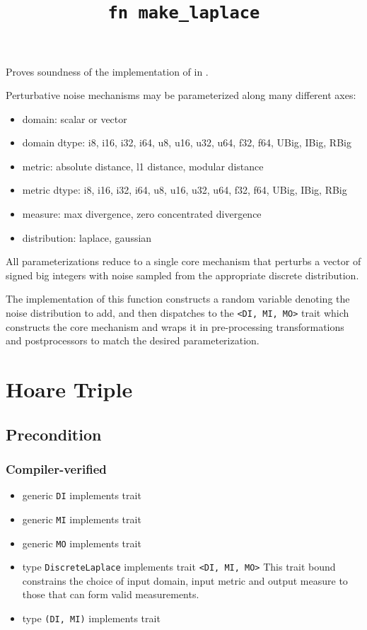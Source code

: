 \documentclass{article}
\title{\texttt{fn make\_laplace}}
\author{\MichaelShoemateAuthor}
\date{}
\begin{document}
\maketitle

\contrib
Proves soundness of the implementation of  in .

Perturbative noise mechanisms may be parameterized along many different axes:
\begin{itemize}
    \item domain: scalar or vector
    \item domain dtype: i8, i16, i32, i64, u8, u16, u32, u64, f32, f64, UBig, IBig, RBig
    \item metric: absolute distance, l1 distance, modular distance
    \item metric dtype: i8, i16, i32, i64, u8, u16, u32, u64, f32, f64, UBig, IBig, RBig
    \item measure: max divergence, zero concentrated divergence
    \item distribution: laplace, gaussian
\end{itemize}

All parameterizations reduce to a single core mechanism that perturbs
a vector of signed big integers with noise sampled from the appropriate discrete distribution.

The implementation of this function constructs a random variable denoting the noise distribution to add,
and then dispatches to the \texttt{<DI, MI, MO>} trait
which constructs the core mechanism and wraps it in pre-processing transformations and postprocessors to match the desired parameterization.

\section{Hoare Triple}
\subsection*{Precondition}
\subsubsection*{Compiler-verified}
\begin{itemize}
    \item generic \texttt{DI} implements trait 
    \item generic \texttt{MI} implements trait 
    \item generic \texttt{MO} implements trait 
    \item type \texttt{DiscreteLaplace} implements trait \texttt{<DI, MI, MO>}
        This trait bound constrains the choice of input domain, input metric and output measure to those that can form valid measurements.
    \item type \texttt{(DI, MI)} implements trait 
\end{itemize}
\end{document}
